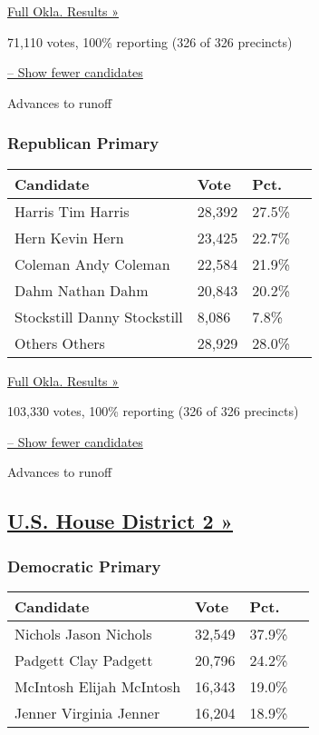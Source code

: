 \href{https://www.nytimes3xbfgragh.onion/elections/results/oklahoma}{Full
Okla. Results »}

71,110 votes, 100\% reporting (326 of 326 precincts)

\protect\hyperlink{}{-- Show fewer candidates}

 Advances to runoff

\hypertarget{republican-primary-1}{%
\subsubsection{Republican Primary}\label{republican-primary-1}}

\begin{longtable}[]{@{}llll@{}}
\toprule
Candidate & Vote & Pct. &\tabularnewline
\midrule
\endhead
 Harris Tim Harris & 28,392 & 27.5\% &\tabularnewline
 Hern Kevin Hern & 23,425 & 22.7\% &\tabularnewline
 Coleman Andy Coleman & 22,584 & 21.9\% &\tabularnewline
 Dahm Nathan Dahm & 20,843 & 20.2\% &\tabularnewline
 Stockstill Danny Stockstill & 8,086 & 7.8\% &\tabularnewline
 Others Others & 28,929 & 28.0\% &\tabularnewline
\bottomrule
\end{longtable}

\href{https://www.nytimes3xbfgragh.onion/elections/results/oklahoma}{Full
Okla. Results »}

103,330 votes, 100\% reporting (326 of 326 precincts)

\protect\hyperlink{}{-- Show fewer candidates}

 Advances to runoff

\hypertarget{us-house-district-2-}{%
\subsection{\texorpdfstring{\href{https://www.nytimes3xbfgragh.onion/elections/results/oklahoma-house-district-2-primary-election}{U.S.
House District 2
»}}{U.S. House District 2 »}}\label{us-house-district-2-}}

\hypertarget{democratic-primary-2}{%
\subsubsection{Democratic Primary}\label{democratic-primary-2}}

\begin{longtable}[]{@{}llll@{}}
\toprule
Candidate & Vote & Pct. &\tabularnewline
\midrule
\endhead
 Nichols Jason Nichols & 32,549 & 37.9\% &\tabularnewline
 Padgett Clay Padgett & 20,796 & 24.2\% &\tabularnewline
 McIntosh Elijah McIntosh & 16,343 & 19.0\% &\tabularnewline
 Jenner Virginia Jenner & 16,204 & 18.9\% &\tabularnewline
\bottomrule
\end{longtable}

